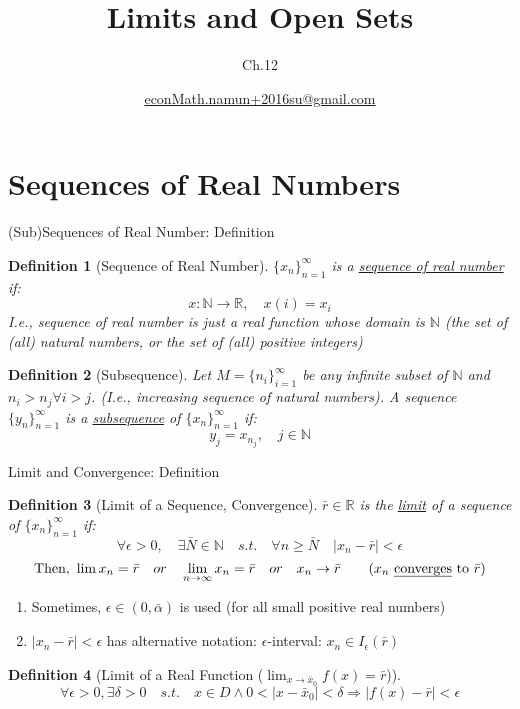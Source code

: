 \documentclass[final]{beamer}
\author[조남운]{\url{econMath.namun+2016su@gmail.com}}
\title{Limits and Open Sets}
\subtitle{Ch.12}
\newtheorem{defn}{Definition}
\begin{document}
	
\maketitle


\section{Sequences of Real Numbers} %
\label{sec:sequences_of_real_numbers}
\begin{frame}[t]{(Sub)Sequences of Real Number: Definition}
	\begin{defn}
		[Sequence of Real Number]
		$\{x_n\}_{n=1}^\infty$ is a \uline{sequence of real number} if:
		\[
			x:\mathbb{N}\rightarrow \mathbb{R},\quad x(i) = x_i 
		\]
		\textit{I.e.,} sequence of real number is just a real function whose domain is $\mathbb{N}$ (the set of (all) natural numbers, or the set of (all) positive integers)
	\end{defn}
	\begin{defn}
		[Subsequence]
		Let $M=\{n_i\}_{i=1}^\infty$ be any infinite subset of $\mathbb{N}$ and $n_i > n_j \forall i>j$. (\textit{I.e.}, increasing sequence of natural numbers). A sequence $\{y_n\}_{n=1}^\infty$ is a \uline{subsequence} of $\{x_n\}_{n=1}^\infty$ if:\[
			y_j = x_{n_j},\quad j\in\mathbb{N}
		\]
	\end{defn}

\end{frame}

\begin{frame}[t]{Limit and Convergence: Definition}
	\begin{defn}
		[Limit of a Sequence, Convergence]
		$\bar r\in \mathbb{R}$ is the \uline{limit} of a sequence of $\{x_n\}_{n=1}^\infty$ if:
		\[
			\forall \epsilon>0,\quad \exists \bar N\in\mathbb{N} \quad s.t.\quad \forall n\ge\bar N \quad |x_n - \bar r|<\epsilon
		\]\[
			\text{Then, } \lim x_n = \bar r \quad or\quad \lim_{n\rightarrow\infty}x_n = \bar r\quad or\quad x_n \rightarrow \bar r \tag{$x_n$ \uline{converges} to $\bar r$}
		\]
	\end{defn}
	\begin{enumerate}[Note 1:]
		\item Sometimes, $\epsilon\in(0,\bar\alpha)$ is used (for all small positive real numbers)
		\item $|x_n - \bar r|<\epsilon$ has alternative notation: $\epsilon$-interval: $x_n \in I_\epsilon(\bar r )$
	\end{enumerate}
	\begin{defn}
		[Limit of a Real Function ($\lim_{x\rightarrow \bar x_0} f(x)= \bar r $)]
		\[
		 \forall \epsilon>0,\exists \delta>0 \quad s.t.\quad x\in D\land 0<|x-\bar x_0 |<\delta \Rightarrow  |f(x)-\bar r |<\epsilon
		\]
	\end{defn}
\end{frame}
\end{document}

